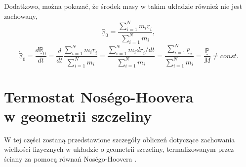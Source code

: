 \documentclass[12pt,a4paper,openright]{report} %
\begin{document}
%
\newline
Dodatkowo, można pokazać, że środek masy w takim układzie również nie jest zachowany,
\begin{equation}
\underline{\mathbb{R}}_0=\frac{\sum_{i=1}^{N} m_i \underline{r}_i}{\sum_{i=1}^{N} m_i},
\end{equation}
%
\begin{equation}
\underline{\mathbb{\dot{R}}}_0=\frac{d \underline{\mathbb{R}}_0}{dt}=\frac{d}{dt} \frac{\sum_{i=1}^{N} m_i \underline{r}_i }{\sum_{i=1}^{N} m_i}=\frac{\sum_{i=1}^{N}
m_i {d \underline{r}_i}/{dt} }{\sum_{i=1}^{N} m_i}=\frac{\sum_{i=1}^{N} \underline{p}_i }{\sum_{i=1}^{N} m_i}=\frac{\underline{\mathbb{P}}}{M} \neq const.
\label{ZachSrodkaM-BT}
\end{equation}
\section{Termostat Nos\'{e}go-Hoovera \\ w geometrii szczeliny}
\label{confNH}
W tej części zostaną przedstawione szczegóły obliczeń dotyczące zachowania wielkości fizycznych w układzie o geometrii szczeliny, termalizowanym przez ściany za pomocą równań Nos\'{e}go-Hoovera \cite{Nose1984, Hoover1985}. 
\end{document}
